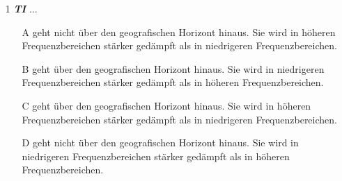 \begin{figure}[H]
\end{figure}


\begin{enumerate} 
\itemsep1pt\parskip0pt
\item[1] \emph{\textbf{TI}}  ...
	\begin{enumerate}
	\itemsep1pt\parskip0pt
		\item[A] geht nicht über den geografischen Horizont hinaus. Sie wird in höheren Frequenzbereichen stärker gedämpft als in niedrigeren Frequenzbereichen.
		\item[B] geht über den geografischen Horizont hinaus. Sie wird in niedrigeren Frequenzbereichen stärker gedämpft als in höheren Frequenzbereichen.
		\item[C] geht über den geografischen Horizont hinaus. Sie wird in höheren Frequenzbereichen stärker gedämpft als in niedrigeren Frequenzbereichen.
		\item[D] geht nicht über den geografischen Horizont hinaus. Sie wird in niedrigeren Frequenzbereichen stärker gedämpft als in höheren Frequenzbereichen.
	\end{enumerate}
\end{enumerate}